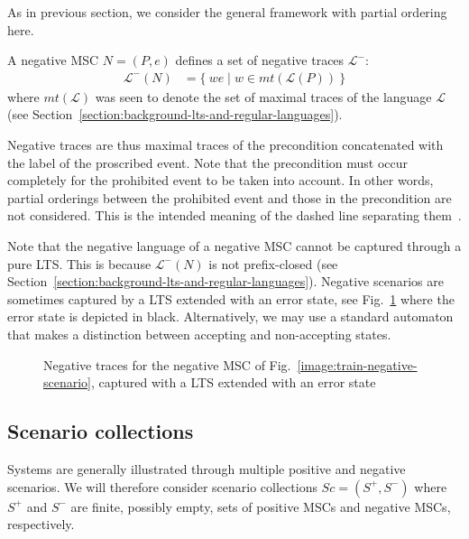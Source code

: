 As in previous section, we consider the general framework with partial ordering here.

A negative MSC $N = (P,e)$ defines a set of negative traces $\mathcal{L}^{-}$:
\begin{align}
\mathcal{L}^{-}(N) &= \{~we \mid w \in mt(\mathcal{L}(P))~\}
\end{align}
\noindent where $mt(\mathcal{L})$ was seen to denote the set of maximal traces of the language $\mathcal{L}$ (see Section~\ref{section:background-lts-and-regular-languages}).

Negative traces are thus maximal traces of the precondition concatenated with the label of the proscribed event. Note that the precondition must occur completely for the prohibited event to be taken into account. In other words, partial orderings between the prohibited event and those in the precondition are not considered. This is the intended meaning of the dashed line separating them~\cite{Uchitel:2004}. 

Note that the negative language of a negative MSC cannot be captured through a pure LTS. This is because $\mathcal{L}^{-}(N)$ is not prefix-closed (see Section~\ref{section:background-lts-and-regular-languages}). Negative scenarios are sometimes captured by a LTS extended with an error state, see Fig.~\ref{image:negative-trace-lts} where the error state is depicted in black. Alternatively, we may use a standard automaton that makes a distinction between accepting and non-accepting states.

\begin{figure}\centering
{}
\caption{Negative traces for the negative MSC of Fig.~\ref{image:train-negative-scenario}, captured with a LTS extended with an error state\label{image:negative-trace-lts}}
\end{figure}

\subsection{Scenario collections\label{subsection:background-scenario-collections}}

Systems are generally illustrated through multiple positive and negative scenarios. We will therefore consider scenario collections $Sc = (S^+,S^-)$ where $S^+$ and $S^-$ are finite, possibly empty, sets of positive MSCs and negative MSCs, respectively.

